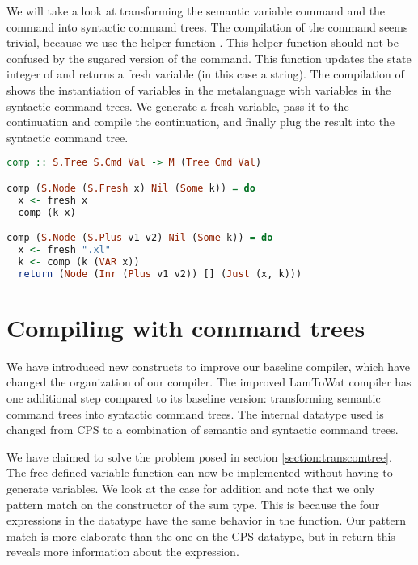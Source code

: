 We will take a look at transforming the semantic  variable command and the  command into syntactic command trees. The compilation of the  command seems trivial, because we use the helper function . This helper function should not be confused by the sugared version of the  command. This function updates the state integer of  and returns a fresh variable (in this case a string). The compilation of  shows the instantiation of variables in the metalanguage with variables in the syntactic command trees. We generate a fresh variable, pass it to the continuation and compile the continuation, and finally plug the result into the syntactic command tree.

\begin{lstlisting}[language=Haskell]
comp :: S.Tree S.Cmd Val -> M (Tree Cmd Val)

comp (S.Node (S.Fresh x) Nil (Some k)) = do
  x <- fresh x
  comp (k x)

comp (S.Node (S.Plus v1 v2) Nil (Some k)) = do
  x <- fresh ".xl"
  k <- comp (k (VAR x))
  return (Node (Inr (Plus v1 v2)) [] (Just (x, k)))
\end{lstlisting}


\section{\label{section:compcomtree}Compiling with command trees}
We have introduced new constructs to improve our baseline compiler, which have changed the organization of our compiler. The improved LamToWat compiler has one additional step compared to its baseline version: transforming semantic command trees into syntactic command trees. The internal datatype used is changed from \ac{CPS} to a combination of semantic and syntactic command trees.


We have claimed to solve the problem posed in section \ref{section:transcomtree}. The free defined variable function  can now be implemented without having to generate variables. We look at the case for addition and note that we only pattern match on the constructor of the sum type. This is because the four expressions in the  datatype have the same behavior in the  function. Our pattern match is more elaborate than the one on the \ac{CPS} datatype, but in return this reveals more information about the expression.

